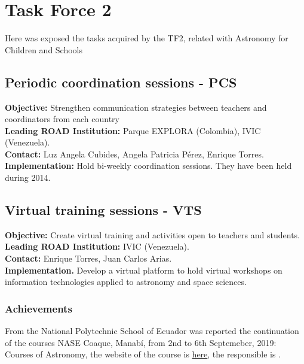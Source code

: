\newpage
\section{Task Force 2}
\label{chapter3}

Here was exposed the tasks acquired by the TF2, related with Astronomy for Children and Schools

\subsection{Periodic coordination sessions - PCS}
\textbf{Objective:} Strengthen communication strategies between teachers and coordinators from each country 
\\
\textbf{Leading ROAD Institution:} Parque EXPLORA (Colombia), IVIC (Venezuela).
\\
\textbf{Contact:} Luz Angela Cubides, Angela Patricia Pérez, Enrique Torres.
\\
\textbf{Implementation:} Hold bi-weekly coordination sessions. They have been held during 2014.





\subsection{Virtual training sessions - VTS}
\textbf{Objective:} Create virtual training and activities open to teachers and students.
\\
\textbf{Leading ROAD Institution:} IVIC (Venezuela).
\\
\textbf{Contact:} Enrique Torres, Juan Carlos Arias.
\\
\textbf{Implementation.} Develop a virtual platform to hold virtual workshops on information technologies applied to astronomy and space sciences.

\subsubsection{Achievements}
From the National Polytechnic School of Ecuador was reported the continuation of the courses NASE Coaque, Manabí, from 2nd to 6th Septemeber, 2019: Courses of Astronomy, the website of the course is \href{http://sac.csic.es/astrosecundaria/es/cursos/realizados/reglados/145_ecuador_2019/ListaDocs.php}{here}, the responsible is .




